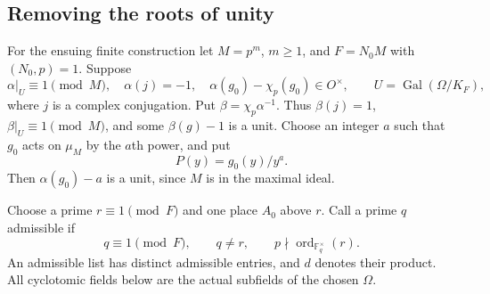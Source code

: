 \subsection{Removing the roots of unity}

For the ensuing finite construction let $M=p^m$, $m\ge1$, and
$F=N_0M$ with $(N_0,p)=1$.  Suppose
\[
 \alpha|_{U}\equiv1\pmod M,\quad
 \alpha(j)=-1,\quad
 \alpha(g_0)-\chi_p(g_0)\in O^\times,
 \qquad U=\operatorname{Gal}(\Omega/K_F),
 \tag{OS.9}
\]
where $j$ is a complex conjugation.  Put
$\beta=\chi_p\alpha^{-1}$.  Thus $\beta(j)=1$,
$\beta|_U\equiv1\pmod M$, and some $\beta(g)-1$ is a unit.
Choose an integer $a$ such that $g_0$ acts on $\mu_M$ by the
$a$th power, and put
\[
                   P(y)=g_0(y)/y^a.
 \tag{OS.10}
\]
Then $\alpha(g_0)-a$ is a unit, since $M$ is in the maximal ideal.

Choose a prime $r\equiv1\pmod F$ and one place $A_0$ above $r$.
Call a prime $q$ admissible if
\[
 q\equiv1\pmod F,\qquad q\ne r,\qquad
              p\nmid\operatorname{ord}_{\mathbb F_q^\times}(r).
 \tag{OS.11}
\]
An admissible list has distinct admissible entries, and $d$ denotes
their product.  All cyclotomic fields below are the actual subfields
of the chosen $\Omega$.

